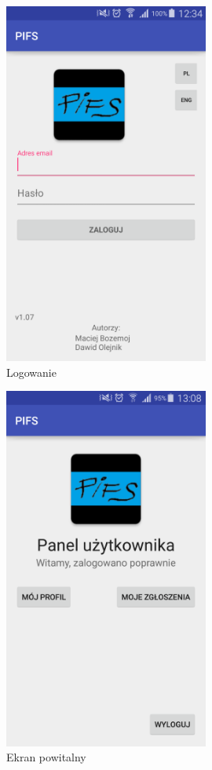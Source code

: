 \documentclass[a4paper,11pt]{article}
\begin{document}
\begin{figure}[h!]
	\centering
	\includegraphics[width=0.6\textwidth,height=0.9\textheight]{startPolski.png}
	\caption{Logowanie}
\end{figure}


\begin{figure}[h!]
	\centering
	\includegraphics[width=0.6\textwidth,height=0.9\textheight]{logowaniePolski.png}
	\caption{Ekran powitalny}
\end{figure}
\end{document}
